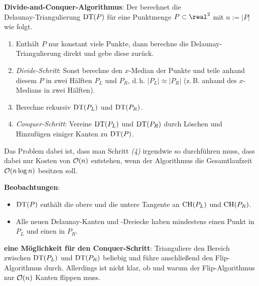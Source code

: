 \textbf{Divide-and-Conquer-Algorithmus}:
Der  berechnet die\\
Delaunay-Triangulierung $\operatorname{DT}(P)$ für eine Punktmenge $P \subset \real^2$ mit $n := |P|$ wie folgt.
\begin{enumerate}
    \item
    Enthält $P$ nur konstant viele Punkte, dann berechne die Delaunay-Triangulierung direkt
    und gebe diese zurück.

    \item
    \emph{Divide-Schritt}:
    Sonst berechne den $x$-Median der Punkte und
    teile anhand diesem $P$ in zwei Hälften $P_L$ und $P_R$,
    d.\,h. $|P_L| \approx |P_R|$
    (z.\,B. anhand des $x$-Medians in zwei Hälften).

    \item
    Berechne rekursiv $\operatorname{DT}(P_L)$ und $\operatorname{DT}(P_R)$.

    \item
    \emph{Conquer-Schritt}:
    Vereine $\operatorname{DT}(P_L)$ und $\operatorname{DT}(P_R)$ durch Löschen und Hinzufügen einiger Kanten
    zu $\operatorname{DT}(P)$.
\end{enumerate}

Das Problem dabei ist, dass man Schritt \emph{(4)} irgendwie so durchführen muss,
dass dabei nur Kosten von $\mathcal{O}(n)$ entstehen, wenn der Algorithmus die
Gesamtlaufzeit $\mathcal{O}(n \log n)$ besitzen soll.

\linie

\textbf{Beobachtungen}:
\begin{itemize}
    \item
    $\operatorname{DT}(P)$ enthält die obere und die untere Tangente an $\operatorname{CH}(P_L)$ und $\operatorname{CH}(P_R)$.

    \item
    Alle neuen Delaunay-Kanten und -Dreiecke haben mindestens einen Punkt in $P_L$ und
    einen in $P_R$.
\end{itemize}

\textbf{eine Möglichkeit für den Conquer-Schritt}:
Trianguliere den Bereich zwischen $\operatorname{DT}(P_L)$ und $\operatorname{DT}(P_R)$ beliebig
und führe anschließend den Flip-Algorithmus durch.
Allerdings ist nicht klar, ob und warum der Flip-Algorithmus nur $\mathcal{O}(n)$ Kanten flippen muss.

\linie

